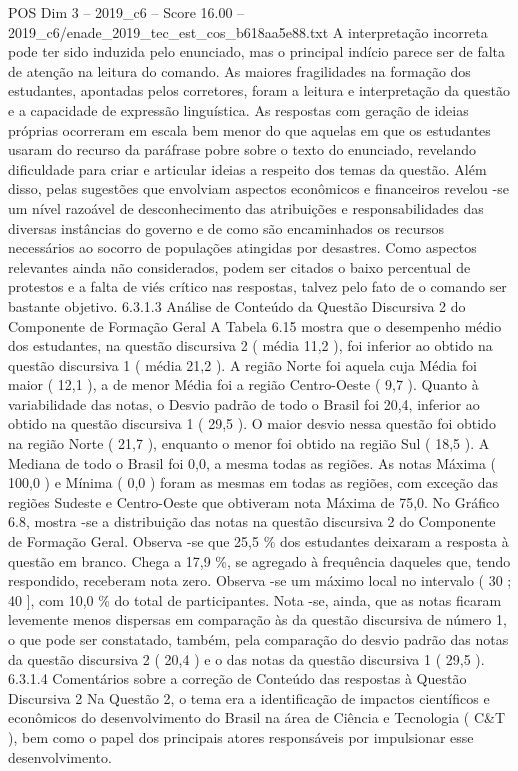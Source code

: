 \begin{textsample}{POS Dim 3 – 2019\_c6 – Score 16.00 – 2019\_c6/enade\_2019\_tec\_est\_cos\_b618aa5e88.txt}
A interpretação incorreta pode ter sido induzida pelo enunciado, mas o principal indício parece ser de falta de atenção na leitura do comando.
As maiores fragilidades na formação dos estudantes, apontadas pelos corretores, foram a leitura e interpretação da questão e a capacidade de expressão linguística.
As respostas com geração de ideias próprias ocorreram em escala bem menor do que aquelas em que os estudantes usaram do recurso da paráfrase pobre sobre o texto do enunciado, revelando dificuldade para criar e articular ideias a respeito dos temas da questão.
Além disso, pelas sugestões que envolviam aspectos econômicos e financeiros revelou -se um nível razoável de desconhecimento das atribuições e responsabilidades das diversas instâncias do governo e de como são encaminhados os recursos necessários ao socorro de populações atingidas por desastres.
Como aspectos relevantes ainda não considerados, podem ser citados o baixo percentual de protestos e a falta de viés crítico nas respostas, talvez pelo fato de o comando ser bastante objetivo. 6.3.1.3 Análise de Conteúdo da Questão Discursiva 2 do Componente de Formação Geral A Tabela 6.15 mostra que o desempenho médio dos estudantes, na questão discursiva 2 ( média 11,2 ), foi inferior ao obtido na questão discursiva 1 ( média 21,2 ).
A região Norte foi aquela cuja Média foi maior ( 12,1 ), a de menor Média foi a região Centro-Oeste ( 9,7 ).
Quanto à variabilidade das notas, o Desvio padrão de todo o Brasil foi 20,4, inferior ao obtido na questão discursiva 1 ( 29,5 ).
O maior desvio nessa questão foi obtido na região Norte ( 21,7 ), enquanto o menor foi obtido na região Sul ( 18,5 ).
A Mediana de todo o Brasil foi 0,0, a mesma todas as regiões.
As notas Máxima ( 100,0 ) e Mínima ( 0,0 ) foram as mesmas em todas as regiões, com exceção das regiões Sudeste e Centro-Oeste que obtiveram nota Máxima de 75,0.
No Gráfico 6.8, mostra -se a distribuição das notas na questão discursiva 2 do Componente de Formação Geral.
Observa -se que 25,5 \% dos estudantes deixaram a resposta à questão em branco.
Chega a 17,9 \%, se agregado à frequência daqueles que, tendo respondido, receberam nota zero.
Observa -se um máximo local no intervalo ( 30 ; 40 ], com 10,0 \% do total de participantes.
Nota -se, ainda, que as notas ficaram levemente menos dispersas em comparação às da questão discursiva de número 1, o que pode ser constatado, também, pela comparação do desvio padrão das notas da questão discursiva 2 ( 20,4 ) e o das notas da questão discursiva 1 ( 29,5 ). 6.3.1.4 Comentários sobre a correção de Conteúdo das respostas à Questão Discursiva 2 Na Questão 2, o tema era a identificação de impactos científicos e econômicos do desenvolvimento do Brasil na área de Ciência e Tecnologia ( C\&T ), bem como o papel dos principais atores responsáveis por impulsionar esse desenvolvimento.

\end{textsample}
